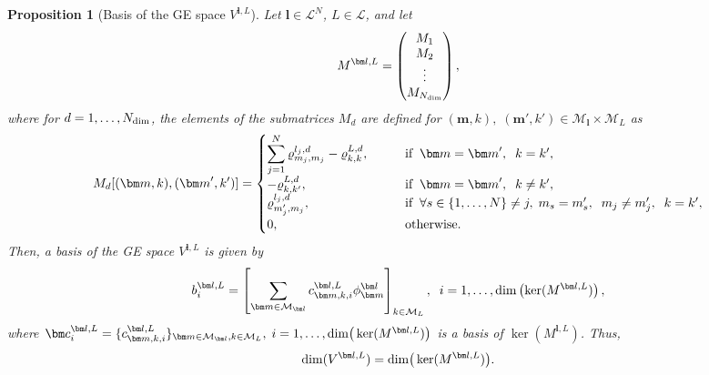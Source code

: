 \documentclass{article}
\newcommand{\vrho}[2]{\varrho^{#1}_{#2}}
\newcommand{\dd}{{d}}
\newcommand{\dimge}[2]{\dim(V^{#1,#2})}
\newtheorem{proposition}[theorem]{Proposition}
\numberwithin{equation}{section}
\def\bc{{\bm c}}
\def\bl{{\bm l}}
\def\bbm{{\bm m}}
\def\calM{\mathcal{M}}
\def\calL{\mathcal{L}}
\def\Nat{{N}}
\def\dim{{{\rm dim}}}
\begin{document}
\begin{proposition}[Basis of the GE space $V^{\bl,L}$]
    \label{prop:GE_basis}
    Let $\bl\in\calL^\Nat$, $L\in\calL$, and let
    \begin{equation}
     \label{eq:matM}
         M^{\bl,L} = \begin{pmatrix}
         M_1 \\
         M_2 \\
         \vdots \\
         M_{N_{\rm{dim}}}
     \end{pmatrix},
     \end{equation}
     where for $\dd = 1,\ldots, N_{\rm{dim}}$,
     the elements of the submatrices 
     $M_\dd$ are defined for $(\bbm,k),\; (\bbm',k') \in \calM_\bl\times\calM_L$ as
    \begin{equation}
        M_\dd[(\bbm,k),(\bbm',k')] = 
        \begin{cases}
        \displaystyle\sum_{j=1}^\Nat
        \vrho{l_j,\dd}{m_j,m_j} - \vrho{L,\dd}{k,k}, \qquad &\textup{if}\;\; \bbm=\bbm',  \; \; k=k', \\
         -\vrho{L,\dd}{k,k'}, \qquad &\textup{if}\;\; 
         \bbm = \bbm',  \; \;  k\ne k', \\
         \vrho{l_j,\dd}{m'_j,m_j}, \qquad &\textup{if}\;\; 
         \forall s\in \{1,\ldots,\Nat\} \neq j,\; m_s = m'_s, \;\; m_j\ne m'_j, \;\;  k = k',\\
        0, \qquad &\textup{otherwise.} \\
    \end{cases}
    \label{eq:M_GE}
    \end{equation}
    Then, a basis of the GE space $V^{\bl,L}$
    is given by
    \begin{equation*}      
        b^{\bl,L}_i = 
        \left[ 
            \sum_{\bbm \in \calM_\bl}c_{\bbm,k,i}^{\bl,L}\phi^\bl_\bbm 
        \right]_{k\in \calM_L},\;\; i=1,\ldots,\dim\left(\ker(M^{\bl,L})\right),
    \end{equation*}
    where $\bc^{\bl,L}_i = \{c_{\bbm,k,i}^{\bl,L}\}_{\bbm\in\calM_\bl,k\in\calM_L},\; i=1,\ldots,\dim\big(\ker(M^{\bl,L})\big)$ is a basis of $\ker(M^{\bl,L})$. 
    Thus,  
    \[
        \dimge{\bl}{L}=\dim\big(\ker(M^{\bl,L})\big).
    \]
\end{proposition}
\end{document}
